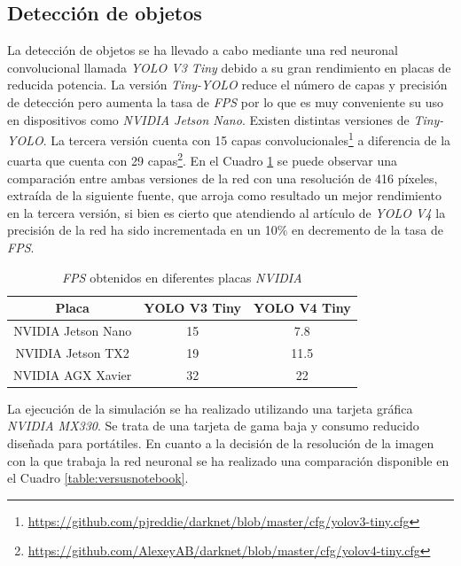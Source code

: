 \subsection{Detección de objetos}
\label{subsection:objectdetector}
La detección de objetos se ha llevado a cabo mediante una red neuronal convolucional llamada \textit{YOLO V3 Tiny} debido a su gran rendimiento en placas de reducida potencia. La versión \textit{Tiny-YOLO} reduce el número de capas y precisión de detección pero aumenta la tasa de \textit{FPS} por lo que es muy conveniente su uso en dispositivos como \textit{NVIDIA Jetson Nano}. Existen distintas versiones de \textit{Tiny-YOLO}. La tercera versión cuenta con 15 capas convolucionales\footnote{\url{https://github.com/pjreddie/darknet/blob/master/cfg/yolov3-tiny.cfg}} a diferencia de la cuarta que cuenta con 29 capas\footnote{\url{https://github.com/AlexeyAB/darknet/blob/master/cfg/yolov4-tiny.cfg}}. En el Cuadro \ref{table:v3vsv4} se puede observar una comparación entre ambas versiones de la red con una resolución de 416 píxeles, extraída de la siguiente fuente\cite{versus}, que arroja como resultado un mejor rendimiento en la tercera versión, si bien es cierto que atendiendo al artículo de \textit{YOLO V4} \cite{yolov4} la precisión de la red ha sido incrementada en un 10\% en decremento de la tasa de \textit{FPS}.\\

\begin{table}[H]
	\begin{center}
		\begin{tabular}{|c|c|c|}
			\hline
			\textbf{Placa}     & \textbf{YOLO V3 Tiny} & \textbf{YOLO V4 Tiny}
			\\
			\hline
			NVIDIA Jetson Nano & 15                    & 7.8
			\\
			NVIDIA Jetson TX2  & 19                    & 11.5
			\\
			NVIDIA AGX Xavier  & 32                    & 22
			\\
			\hline
		\end{tabular}
		\caption{\textit{FPS} obtenidos en diferentes placas \textit{NVIDIA}}
		\label{table:v3vsv4}
	\end{center}
\end{table}

La ejecución de la simulación se ha realizado utilizando una tarjeta gráfica \textit{NVIDIA MX330}. Se trata de una tarjeta de gama baja y consumo reducido diseñada para portátiles. En cuanto a la decisión de la resolución de la imagen con la que trabaja la red neuronal se ha realizado una comparación disponible en el Cuadro \ref{table:versusnotebook}.\\

